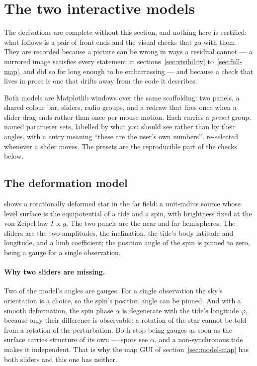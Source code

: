 
\section{The two interactive models}
\label{sec:models}

The derivations are complete without this section, and nothing here is certified: what
follows is a pair of front ends and the visual checks that go with them.  They are recorded
because a picture can be wrong in ways a residual cannot --- a mirrored image satisfies every
statement in sections~\ref{sec:visibility} to~\ref{sec:full-map}, and did so for long enough
to be embarrassing --- and because a check that lives in prose is one that drifts away from
the code it describes.

Both models are Matplotlib windows over the same scaffolding: two panels, a shared colour
bar, sliders, radio groups, and a redraw that fires once when a slider drag ends rather than
once per mouse motion.  Each carries a \emph{preset} group: named parameter sets, labelled by
what you should see rather than by their angles, with a  entry meaning ``these
are the user's own numbers'', re-selected whenever a slider moves.  The presets are the
reproducible part of the checks below.

\subsection{The deformation model}
\label{sec:model-deformation}

 shows a rotationally deformed star in the far field: a unit-radius source
whose level surface is the equipotential of a tide and a spin, with brightness fixed at the
von Zeipel law $I \propto g$.  The two panels are the near and far hemispheres.  The sliders
are the two amplitudes, the inclination, the tide's body latitude and longitude, and a limb
coefficient; the position angle of the spin is pinned to zero, being a gauge for a single
observation.

\paragraph{Why two sliders are missing.}  Two of the model's angles are gauges.  For a single
observation the sky's orientation is a choice, so the spin's position angle can be pinned.
And with a smooth deformation, the spin phase $\alpha$ is degenerate with
the tide's longitude $\varphi$, because only their difference is observable: a rotation of the
star cannot be told from a rotation of the perturbation.  Both stop being gauges as soon as
the surface carries structure of its own --- spots see $\alpha$, and a non-synchronous tide
makes it independent.  That is why the map GUI of section~\ref{sec:model-map} has both
sliders and this one has neither.

